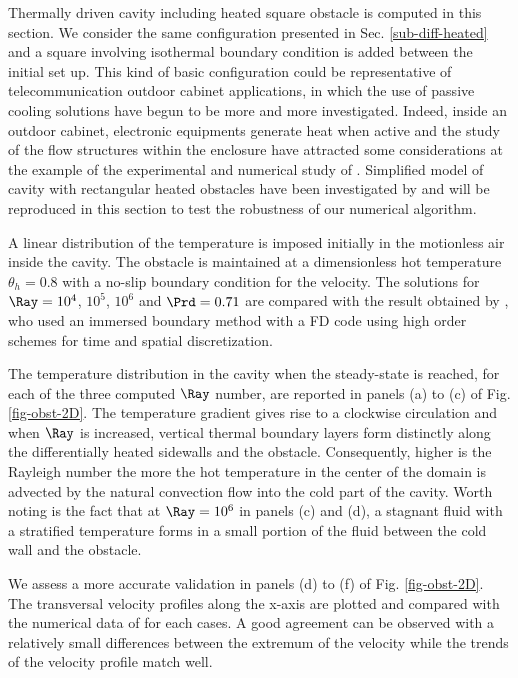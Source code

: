 Thermally driven cavity including heated square obstacle is computed in this section.
We consider the same configuration presented in Sec. \ref{sub-diff-heated} and a square involving isothermal boundary condition is added between the initial set up.
This kind of basic configuration could be representative of telecommunication outdoor cabinet applications, in which the use of passive cooling solutions have begun to be more and more investigated.
Indeed, inside an outdoor cabinet, electronic equipments generate heat when active and the study of the flow structures within the enclosure have attracted some considerations at the example of the experimental and numerical study of \cite{Raluca2013}.
Simplified model of cavity with rectangular heated obstacles have been investigated by \cite{Raluca2013} and will be reproduced in this section to test the robustness of our numerical algorithm.

A linear distribution of the temperature is imposed initially in the motionless air inside the cavity.
The obstacle is maintained at a dimensionless hot temperature $\theta_h = 0.8$ with a no-slip boundary condition for the velocity.
The solutions for $\Ray= 10^4$, $10^5$, $10^6$ and $\Prd = 0.71$ are compared with the result obtained by \cite{Raluca2013}, who used an immersed boundary method with a FD code using high order schemes for time and spatial discretization.

The temperature distribution in the cavity when the steady-state is reached, for each of the three computed $\Ray$ number, are reported in panels (a) to (c) of Fig. \ref{fig-obst-2D}.
The temperature gradient gives rise to a clockwise circulation and when $\Ray$ is increased, vertical thermal boundary layers form distinctly along the differentially heated sidewalls and the obstacle.
Consequently, 
higher is the Rayleigh number the more the hot temperature in the center of the domain is advected by the natural convection flow into the cold part of the cavity. 
Worth noting is the fact that at $\Ray = 10^6$ in panels (c) and (d), a stagnant fluid with a stratified temperature forms in a small portion of the fluid between the cold wall and the obstacle.

We assess a more accurate validation in panels (d) to (f) of Fig. \ref{fig-obst-2D}.
The transversal velocity profiles along the x-axis are plotted and compared with the numerical data of \cite{Raluca2013} for each cases. 
A good agreement can be observed with a relatively small differences between the extremum of the velocity while the trends of the velocity profile match well.

